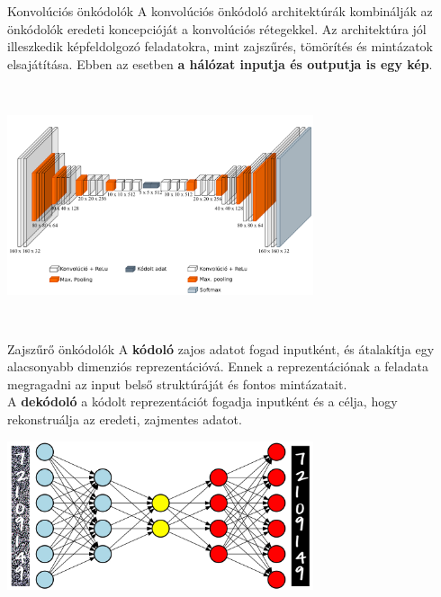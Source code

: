 \documentclass[english, aspectratio=169]{beamer}
\begin{document}
\begin{frame}{Konvolúciós önkódolók}
	A konvolúciós önkódoló architektúrák kombinálják az önkódolók eredeti koncepcióját a konvolúciós rétegekkel. Az architektúra jól illeszkedik képfeldolgozó feladatokra, mint zajszűrés, tömörítés és mintázatok elsajátítása. Ebben az esetben \textbf{a hálózat inputja és outputja is egy kép}.
	\begin{center}
		\includegraphics[height=7cm, width=9cm, keepaspectratio]{images/dl_9.png}
	\end{center}
\end{frame}

\begin{frame}{Zajszűrő önkódolók}
	A \textbf{kódoló} zajos adatot fogad inputként, és átalakítja egy alacsonyabb dimenziós reprezentációvá. Ennek a reprezentációnak a feladata megragadni az input belső struktúráját és fontos mintázatait.\\
	A \textbf{dekódoló} a kódolt reprezentációt fogadja inputként és a célja, hogy rekonstruálja az eredeti, zajmentes adatot.
	\begin{center}
		\includegraphics[width=9cm, keepaspectratio]{images/dl_10.png}
	\end{center}
\end{frame}
\end{document}
